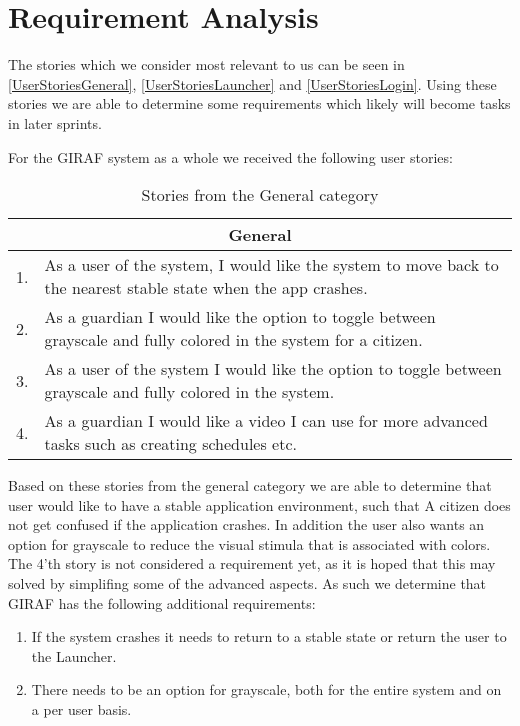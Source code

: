 \section{Requirement Analysis}\label{S2:NewReqs}
The stories which we consider most relevant to us can be seen in
\autoref{UserStoriesGeneral}, \autoref{UserStoriesLauncher} and
\autoref{UserStoriesLogin}. Using these stories we are able to determine some
requirements which likely will become tasks in later sprints.\nl

For the GIRAF system as a whole we received the following user stories:
\begin{table}[H]
\begin{tabular}{|c|p{12.5cm}|}
\hline 
\multicolumn{2}{|c|}{General}\\\hline
1. & As a user of the system, I would like the system to move back to the
nearest stable state when the app crashes.\\\hline
2. & As a guardian I would like the option to toggle between grayscale and fully
colored in the system for a citizen. \\ \hline
3. & As a user of the system I would like the option to toggle between grayscale
and fully colored in the system. \\\hline
4. & As a guardian I would like a video I can use for more advanced tasks such
as creating schedules etc.\\\hline
\end{tabular}
\caption{Stories from the General category}
\label{UserStoriesGeneral}
\end{table}

Based on these stories from the general category we are able to determine that
user would like to have a stable application environment, such that A
citizen does not get confused if the application crashes. In addition the user
also wants an option for grayscale to reduce the visual stimula that is
associated with colors. The 4'th story is not considered a requirement yet, as
it is hoped that this may solved by simplifing some of the advanced aspects. As
such we determine that GIRAF has the following additional requirements:
\begin{enumerate}
  \item If the system crashes it needs to return to a stable state or return the
  user to the Launcher.
  \item There needs to be an option for grayscale, both for the entire system
  and on a per user basis.
\end{enumerate}

